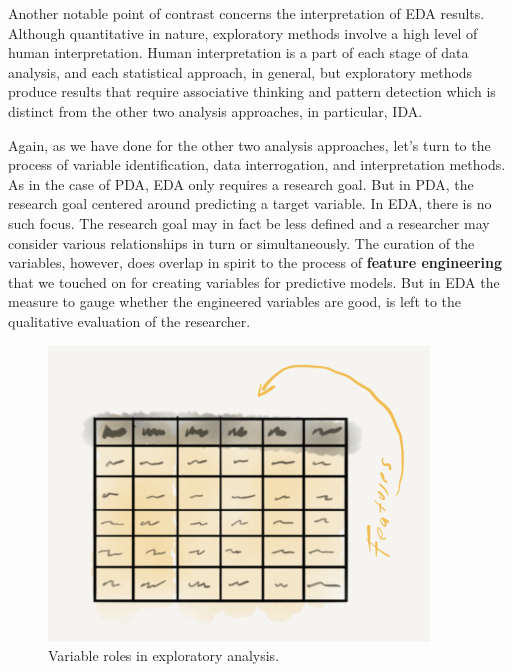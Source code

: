 \documentclass[
  letterpaper,
]{latex/krantz}
\begin{document}
Another notable point of contrast concerns the interpretation of EDA
results. Although quantitative in nature, exploratory methods involve a
high level of human interpretation. Human interpretation is a part of
each stage of data analysis, and each statistical approach, in general,
but exploratory methods produce results that require associative
thinking and pattern detection which is distinct from the other two
analysis approaches, in particular, IDA.

Again, as we have done for the other two analysis approaches, let's turn
to the process of variable identification, data interrogation, and
interpretation methods. As in the case of PDA, EDA only requires a
research goal. But in PDA, the research goal centered around predicting
a target variable. In EDA, there is no such focus. The research goal may
in fact be less defined and a researcher may consider various
relationships in turn or simultaneously. The curation of the variables,
however, does overlap in spirit to the process of \textbf{feature
engineering} that we touched on for creating variables for predictive
models. But in EDA the measure to gauge whether the engineered variables
are good, is left to the qualitative evaluation of the researcher.

\begin{figure}

{\centering \includegraphics[width=0.9\textwidth,height=\textheight]{./figures/approaching-analysis/exploratory-variables.png}

}

\caption{\label{fig-aa-exploratory-variables}Variable roles in
exploratory analysis.}

\end{figure}
\end{document}

